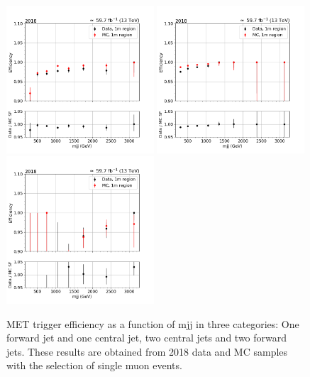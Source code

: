 \begin{figure}[hbp]
    \begin{center}
        \includegraphics[width=0.49\textwidth]{fig/efficiency/trigger/met/mjj/data_mc_comparison_1m_2018_one_jet_forward_one_jet_central.png}
        \includegraphics[width=0.49\textwidth]{fig/efficiency/trigger/met/mjj/data_mc_comparison_1m_2018_two_central_jets.png} \\
        \includegraphics[width=0.49\textwidth]{fig/efficiency/trigger/met/mjj/data_mc_comparison_1m_2018_two_forward_jets.png}
    \end{center}
    \caption{MET trigger efficiency as a function of mjj in three categories: One forward jet and one central jet, two central jets and
            two forward jets. These results are obtained from 2018 data and MC samples with the selection of single muon events.}
    \label{fig:eff_mjj_2018_1m}
\end{figure}


